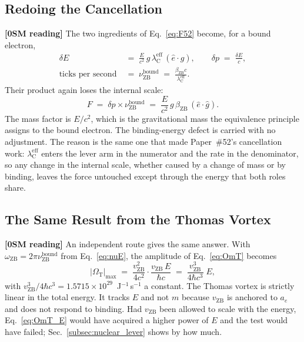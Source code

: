 \documentclass[%
 reprint, amsmath,amssymb, aps, prb, ]{revtex4-2}
\numberwithin{equation}{section}
\newcommand{\omZB}{\omega_{\text{ZB}}}
\newcommand{\vZB}{v_{\text{ZB}}}
\newcommand{\betaZB}{\beta_{\text{ZB}}}
\newcommand{\lambdaC}{\lambda_{\text{C}}}
\newcommand{\nuZB}{\nu_{\text{ZB}}}
\newcommand{\OmT}{\Omega_{\text{T}}}
\begin{document}
\subsection{Redoing the Cancellation}
\label{subsec:redo}

\textbf{[0SM reading]} The two ingredients of Eq.~\eqref{eq:F52} become, for a bound electron,
\begin{align}
\delta E &\;=\; \frac{E}{c^{2}}\,g\,\lambdaC^{\text{eff}}\,(\hat{e}\cdot\hat{g}),
\qquad
\delta p \;=\; \frac{\delta E}{c},
\label{eq:dE_bound}\\[2pt]
\text{ticks per second} &\;=\; \nuZB^{\text{bound}} \;=\; \frac{\betaZB c}{\lambdaC^{\text{eff}}} .
\label{eq:rate_bound}
\end{align}
Their product again loses the internal scale:
\begin{equation}
F \;=\; \delta p\times\nuZB^{\text{bound}}
\;=\; \frac{E}{c^{2}}\,g\,\betaZB\,(\hat{e}\cdot\hat{g}) .
\label{eq:F_bound}
\end{equation}
The mass factor is $E/c^{2}$, which is the gravitational mass the equivalence principle assigns to the bound electron. The binding-energy defect is carried with no adjustment. The reason is the same one that made Paper~\#52's cancellation work: $\lambdaC^{\text{eff}}$ enters the lever arm in the numerator and the rate in the denominator, so any change in the internal scale, whether caused by a change of mass or by binding, leaves the force untouched except through the energy that both roles share.

\subsection{The Same Result from the Thomas Vortex}
\label{subsec:OmT_reduce}

\textbf{[0SM reading]} An independent route gives the same answer. With $\omZB = 2\pi\nuZB^{\text{bound}}$ from Eq.~\eqref{eq:nuE}, the amplitude of Eq.~\eqref{eq:OmT} becomes
\begin{equation}
\lvert\OmT\rvert_{\max}
\;=\; \frac{\vZB^{2}}{4c^{2}}\cdot\frac{\vZB\,E}{\hbar c}
\;=\; \frac{\vZB^{3}}{4\hbar c^{3}}\;E ,
\label{eq:OmT_E}
\end{equation}
with $\vZB^{3}/4\hbar c^{3} = 1.5715\times10^{29}$~J$^{-1}$\,s$^{-1}$ a constant. The Thomas vortex is strictly linear in the total energy. It tracks $E$ and not $m$ because $\vZB$ is anchored to $a_e$ and does not respond to binding. Had $\vZB$ been allowed to scale with the energy, Eq.~\eqref{eq:OmT_E} would have acquired a higher power of $E$ and the test would have failed; Sec.~\ref{subsec:nuclear_lever} shows by how much.
\end{document}
